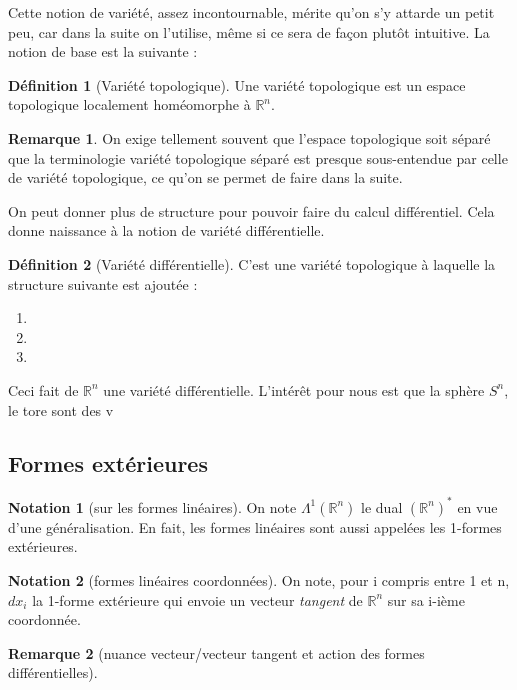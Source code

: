 \documentclass{article}
\newcommand{\R}{\mathbb{R}} %
\theoremstyle{definition} %
\newtheorem{defi}{Définition}
\newtheorem{rmq}{Remarque}
\newtheorem{nota}{Notation}
\newcommand{\1}{\mathbb{1}} %
\begin{document}
Cette notion de variété, assez incontournable, mérite qu'on s'y attarde un petit peu, car dans la suite on l'utilise, même si ce sera de façon plutôt intuitive.
La notion de base est la suivante :

\begin{defi}[Variété topologique]
    Une variété topologique est un espace topologique localement homéomorphe à $\R^n$.
\end{defi}

\begin{rmq}
    On exige tellement souvent que l'espace topologique soit séparé que la terminologie variété topologique séparé est presque sous-entendue par celle de variété topologique, ce qu'on se permet de faire dans la suite.
\end{rmq}

On peut donner plus de structure pour pouvoir faire du calcul différentiel. Cela donne naissance à la notion de variété différentielle.

\begin{defi}[Variété différentielle]
C'est une variété topologique à laquelle la structure suivante est ajoutée :
\begin{enumerate}
    \item 
    \item
    \item
\end{enumerate}
\end{defi}

Ceci fait de $\R^n$ une variété différentielle. L'intérêt pour nous est que la sphère $S^n$, le tore sont des v


\subsection{Formes extérieures}
\begin{nota}[sur les formes linéaires]
On note $\Lambda^1 (\R^n)$ le dual $(\R^n)^*$ en vue d'une généralisation. En fait, les formes linéaires sont aussi appelées les 1-formes extérieures.
\end{nota}

\begin{nota}[formes linéaires coordonnées]
On note, pour i compris entre 1 et n, $dx_i$ la 1-forme extérieure qui envoie un vecteur \textit{tangent} de $\R^n$ sur sa i-ième coordonnée.
\end{nota}

\begin{rmq}[nuance vecteur/vecteur tangent et action des formes différentielles]

\end{rmq}
\end{document}
